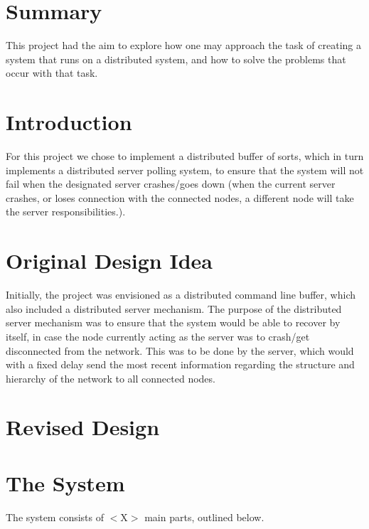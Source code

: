\documentclass[12pt]{article}
\begin{document}
\section{Summary} %
\label{sec:summary}
This project had the aim to explore how one may approach the task of creating a system that runs on a distributed system, and how to solve the problems that occur with that task.

\section{Introduction} %
\label{sec:introduction}
For this project we chose to implement a distributed buffer of sorts, which in turn implements a distributed server polling system, to ensure that the system will not fail when the designated server crashes/goes down (when the current server crashes, or loses connection with the connected nodes, a different node will take the server responsibilities.).

\section{Original Design Idea} %
\label{sec:original_design_idea}

Initially, the project was envisioned as a distributed command line buffer, which also included a distributed server mechanism. The purpose of the distributed server mechanism was to ensure that the system would be able to recover by itself, in case the node currently acting as the server was to crash/get disconnected from the network. This was to be done by the server, which would with a fixed delay send the most recent information regarding the structure and hierarchy of the network to all connected nodes.

\section{Revised Design} %
\label{sec:revised_design}



\section{The System} %
\label{sec:the_system}
The system consists of $<$X$>$ main parts, outlined below.
\end{document}
